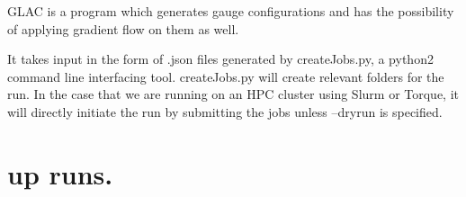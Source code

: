 G\+L\+AC is a program which generates gauge configurations and has the possibility of applying gradient flow on them as well.

It takes input in the form of .json files generated by create\+Jobs.\+py, a python2 command line interfacing tool. create\+Jobs.\+py will create relevant folders for the run. In the case that we are running on an H\+PC cluster using Slurm or Torque, it will directly initiate the run by submitting the jobs unless {\ttfamily --dryrun} is specified.\hypertarget{index_Setting}{}\section{up runs.}\label{index_Setting}
